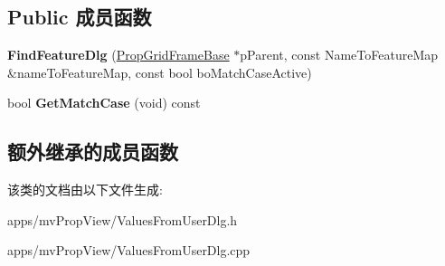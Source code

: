 \subsection*{Public 成员函数}
\begin{DoxyCompactItemize}
\item 
\hypertarget{class_find_feature_dlg_adab44752013e8b05aa3274407cabbe51}{{\bfseries Find\+Feature\+Dlg} (\hyperlink{class_prop_grid_frame_base}{Prop\+Grid\+Frame\+Base} $\ast$p\+Parent, const Name\+To\+Feature\+Map \&name\+To\+Feature\+Map, const bool bo\+Match\+Case\+Active)}\label{class_find_feature_dlg_adab44752013e8b05aa3274407cabbe51}

\item 
\hypertarget{class_find_feature_dlg_a3d67b5d1eebb4f0a83759fe8575d3456}{bool {\bfseries Get\+Match\+Case} (void) const }\label{class_find_feature_dlg_a3d67b5d1eebb4f0a83759fe8575d3456}

\end{DoxyCompactItemize}
\subsection*{额外继承的成员函数}


该类的文档由以下文件生成\+:\begin{DoxyCompactItemize}
\item 
apps/mv\+Prop\+View/Values\+From\+User\+Dlg.\+h\item 
apps/mv\+Prop\+View/Values\+From\+User\+Dlg.\+cpp\end{DoxyCompactItemize}
